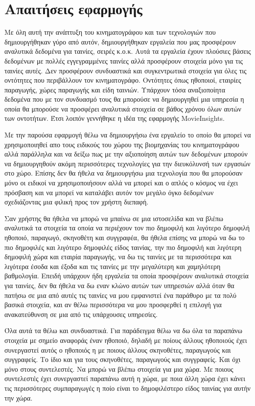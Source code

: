 \chapter{Απαιτήσεις εφαρμογής}
Με όλη αυτή την ανάπτυξη του κινηματογράφου και των τεχνολογιών που δημιουργήθηκαν γύρο από αυτόν, δημιουργήθηκαν εργαλεία που μας προσφέρουν αναλυτικά δεδομένα για ταινίες, σειρές κ.ο.κ. Αυτά τα εργαλεία έχουν πλούσιες βάσεις δεδομένων με πολλές εγγεγραμμένες ταινίες αλλά προσφέρουν στοιχεία μόνο για τις ταινίες αυτές. Δεν προσφέρουν συνδυαστικά και συγκεντρωτικά στοιχεία για όλες τις οντότητες που περιβάλλουν τον κινηματογράφο. Οντότητες όπως ηθοποιοί, εταιρίες παραγωγής, χώρες παραγωγής και είδη ταινιών. Υπάρχουν τόσα αναξιοποίητα δεδομένα που με τον συνδυασμό τους θα μπορούσε να δημιουργηθεί μια υπηρεσία η οποία θα μπορούσε να προσφέρει αναλυτικά στοιχεία σε βάθος χρόνου όλων αυτών των οντοτήτων. Έτσι λοιπόν γεννήθηκε η ιδέα της εφαρμογής MovieInsights. 

Με την παρούσα εφαρμογή θέλω να δημιουργήσω ένα εργαλείο το οποίο θα μπορεί να χρησιμοποιηθεί απο τους ειδικούς του χώρου της βιομηχανίας του κινηματογράφου αλλά παράλληλα και να δείξω πως με την αξιοποίηση αυτών των δεδομένων μπορούν να δημιουργηθούν ακόμη περισσότερες τεχνολογίες για την διευκόλυνσή των εργασιών στο χώρο. Επίσης δεν θα ήθελα να δημιουργήσω μια τεχνολογία που θα μπορούσαν μόνο οι ειδικοί να χρησιμοποιήσουν αλλά να μπορεί και ο απλός ο κόσμος να έχει πρόσβαση και να μπορεί να καταλάβει αυτόν τον μεγάλο όγκο δεδομένων σχεδιάζοντας μια φιλική προς τον χρήστη διεπαφή.


Σαν χρήστης θα ήθελα να μπορώ να μπαίνω σε μια ιστοσελίδα και να βλέπω αναλυτικά τα στοιχεία τα οποία να περιέχουν τον πιο δημοφιλή και λιγότερο δημοφιλή ηθοποιό, παραγωγό, σκηνοθέτη και συγγραφέα, θα ήθελα επίσης να μπορώ να δω το πιο δημοφιλές και λιγότερο δημοφιλές είδος ταινίας, την πιο δημοφιλή και λιγότερη δημοφιλή χώρα και εταιρία παραγωγής, να δω τις ταινίες με τα περισσότερα και λιγότερα έσοδα και έξοδα και τις ταινίες με την μεγαλύτερη και χαμηλότερη βαθμολογία. Επειδή υπάρχουν ήδη εργαλεία τα οποία προσφέρουν αναλυτικά στοιχεία για ταινίες, δεν θα ήθελα να δω εναν κλώνο αυτών των υπηρεσιών αλλά όταν θα πατήσω σε μια από αυτές τις ταινίες να μου εμφανιστεί ένα παράθυρο με τα πολύ βασικά στοιχεία, και αν θέλω περισσότερα να μου προσφερθεί η επιλογή για ανακατεύθυνση σε μια από τις υπάρχουσες υπηρεσίες.

Όλα αυτά τα θέλω και συνδυαστικά. Για παράδειγμα θέλω να δω όλα τα παραπάνω στοιχεία με σημείο αναφοράς έναν ηθοποιό, δηλαδή με ποίους άλλους ηθοποιούς έχει συνεργαστεί αυτός ο ηθοποιός η με ποιους άλλους σκηνοθέτες, παραγωγούς και συγγραφείς. Το ίδιο και για τους σκηνοθέτες, παραγωγούς και συγγραφείς. Και όχι μόνο στους συντελεστές. Να μπορώ να βλέπω στοιχεία για μια χώρα. Με ποιους συντελεστές έχει συνεργαστεί παραπάνω αυτή η χώρα, με ποια άλλη χώρα έχει κάνει τις περισσότερες συμπαραγωγές η ποίο είναι το δημοφιλέστερο είδος ταινίας για αυτήν την χώρα. 

